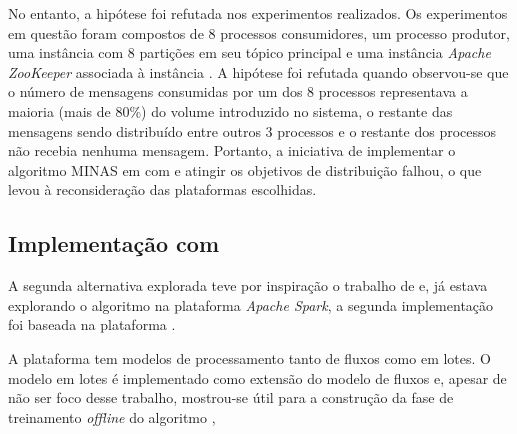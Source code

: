 No entanto, a hipótese foi refutada nos experimentos realizados.
Os experimentos em questão foram compostos de 8 processos consumidores, um
processo produtor, uma instância \kafka com 8 partições em seu tópico principal
e uma instância \emph{Apache ZooKeeper} associada à instância \kafka.
A hipótese foi refutada quando observou-se que o número de
mensagens consumidas por um dos $8$ processos representava a maioria (mais de
$80\%$) do volume introduzido no sistema, o restante das mensagens sendo distribuído entre
outros 3 processos e o restante dos processos não recebia nenhuma mensagem.
Portanto, a iniciativa de implementar o algoritmo MINAS em \python com \kafka e
atingir os objetivos de distribuição falhou, o que levou à reconsideração das
plataformas escolhidas.


\subsection{Implementação com \flink}


A segunda alternativa explorada teve por inspiração o trabalho de
 e,  já estava explorando
o algoritmo na plataforma \emph{Apache Spark}, a segunda implementação
foi baseada na plataforma \flink.

A plataforma \flink tem modelos de processamento tanto de fluxos como em lotes.
O modelo em lotes é implementado como extensão do modelo de fluxos e, apesar de
não ser foco desse trabalho, mostrou-se útil para a construção da fase de
treinamento \emph{offline} do algoritmo \minas, 

